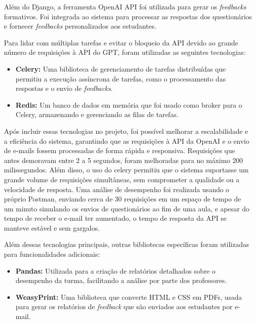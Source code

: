 Além do Django, a ferramenta OpenAI API foi utilizada para gerar os \textit{\textit{feedbacks}} formativos. Foi integrada ao sistema para processar as respostas dos questionários e fornecer \textit{\textit{feedbacks}} personalizados aos estudantes.

Para lidar com múltiplas tarefas e evitar o bloqueio da API devido ao grande número de requisições à API do GPT, foram utilizadas as seguintes tecnologias:

\begin{itemize}
    \item \textbf{Celery:} Uma biblioteca de gerenciamento de tarefas distribuídas que permitiu a execução assíncrona de tarefas, como o processamento das respostas e o envio de \textit{\textit{feedbacks}}.
    \item \textbf{Redis:} Um banco de dados em memória que foi usado como broker para o Celery, armazenando e gerenciando as filas de tarefas.
\end{itemize}

Após incluir essas tecnologias no projeto, foi possível melhorar a escalabilidade e a eficiência do sistema, garantindo que as requisições à API da OpenAI e o envio de e-mails fossem processadas de forma rápida e responsiva. Requisições que antes demoravam entre 2 a 5 segundos, foram melhoradas para no máximo 200 milissegundos. Além disso, o uso do celery permitiu que o sistema suportasse um grande volume de requisições simultâneas, sem comprometer a qualidade ou a velocidade de resposta. Uma análise de desempenho foi realizada usando o próprio Postman, enviando cerca de 30 requisições em um espaço de tempo de um minuto simulando os envios de questionários ao fim de uma aula, e apesar do tempo de receber o e-mail ter aumentado, o tempo de resposta da API se manteve estável e sem gargalos.

Além dessas tecnologias principais, outras bibliotecas específicas foram utilizadas para funcionalidades adicionais:

\begin{itemize}
    \item \textbf{Pandas:} Utilizada para a criação de relatórios detalhados sobre o desempenho da turma, facilitando a análise por parte dos professores.
    \item \textbf{WeasyPrint:} Uma biblioteca que converte HTML e CSS em PDFs, usada para gerar os relatórios de \textit{feedback} que são enviados aos estudantes por e-mail.
\end{itemize}

